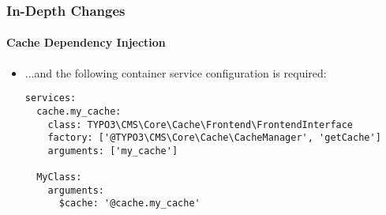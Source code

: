 
\begin{frame}[fragile]
	\frametitle{In-Depth Changes}
	\framesubtitle{Cache Dependency Injection}

	\lstset{basicstyle=\tiny\ttfamily}

	\begin{itemize}
		\item ...and the following container service configuration is required:
\begin{lstlisting}
services:
  cache.my_cache:
    class: TYPO3\CMS\Core\Cache\Frontend\FrontendInterface
    factory: ['@TYPO3\CMS\Core\Cache\CacheManager', 'getCache']
    arguments: ['my_cache']

  MyClass:
    arguments:
      $cache: '@cache.my_cache'
\end{lstlisting}

	\end{itemize}

\end{frame}


